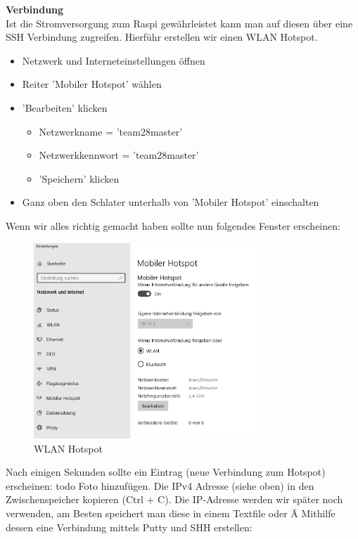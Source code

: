 \documentclass[../../main.tex]{subfiles}
\begin{document}
\textbf{Verbindung}\\
Ist die Stromversorgung zum Raspi gewährleistet kann man auf diesen über eine SSH Verbindung zugreifen. Hierführ erstellen wir einen WLAN Hotspot.
\begin{itemize}
    \item Netzwerk und Interneteinstellungen öffnen
    \item Reiter 'Mobiler Hotspot' wählen
    \item 'Bearbeiten' klicken
    \begin{itemize}
        \item Netzwerkname = 'team28master'
        \item Netzwerkkennwort = 'team28master'
        \item 'Speichern' klicken
    \end{itemize}
    \item Ganz oben den Schlater unterhalb von 'Mobiler Hotspot' einschalten
\end{itemize}

Wenn wir alles richtig gemacht haben sollte nun folgendes Fenster erscheinen:
\begin{figure}[H] \centering
    \includegraphics[width=0.75\textwidth]{HotSpot}
    \caption{WLAN Hotspot}
    \label{fig:HotSpot}
\end{figure}

Nach einigen Sekunden sollte ein Eintrag (neue Verbindung zum Hotspot) erscheinen: {todo} Foto hinzufügen.
Die IPv4 Adresse (siehe oben) in den Zwischenspeicher kopieren (Ctrl + C). Die IP-Adresse werden wir später noch verwenden, am Besten speichert man diese in einem Textfile oder Ä
Mithilfe dessen eine Verbindung mittels Putty und SHH erstellen:
\end{document}
